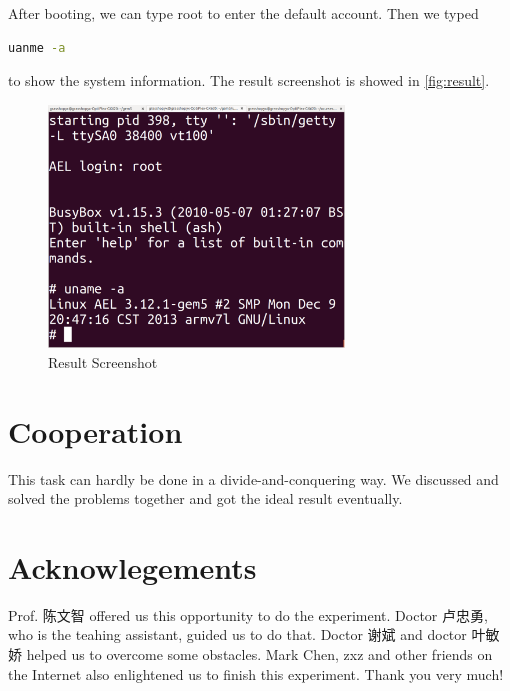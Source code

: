 \documentclass[utf8,a4paper]{article}
\begin{document}
After booting, we can type root to enter the default account. Then we typed
\begin{lstlisting}[language=bash, frame=shadowbox]
uanme -a
\end{lstlisting}
to show the system information. The result screenshot is showed in \autoref{fig:result}.
\begin{figure}[htbp]
\centering
\includegraphics[width=0.7\textwidth]{images/result.png}
\caption{Result Screenshot}\label{fig:result}
\end{figure}
	
\section{Cooperation}
This task can hardly be done in a divide-and-conquering way. We discussed and solved the problems together and got the ideal result eventually.

\section{Acknowlegements}
Prof. 陈文智 offered us this opportunity to do the experiment. Doctor 卢忠勇, who is the teahing assistant, guided us to do that. Doctor 谢斌 and doctor 叶敏娇 helped us to overcome some obstacles. Mark Chen, zxz and other friends on the Internet also enlightened us to finish this experiment. Thank you very much!
\end{document}
